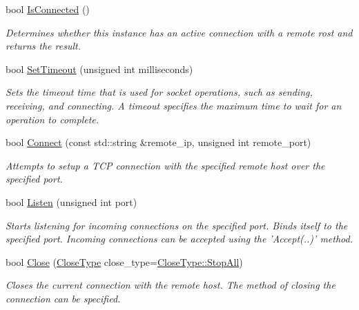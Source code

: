 \begin{DoxyCompactItemize}
bool \hyperlink{class_senergy_1_1_networking_1_1_socket_adae19c7088b61be82507a18ff1865ac8}{Is\-Connected} ()
\begin{DoxyCompactList}\small\item\em Determines whether this instance has an active connection with a remote rost and returns the result. \end{DoxyCompactList}\item 
bool \hyperlink{class_senergy_1_1_networking_1_1_socket_a5d68f35398c2460bdfca32f0d43a556d}{Set\-Timeout} (unsigned int milliseconds)
\begin{DoxyCompactList}\small\item\em Sets the timeout time that is used for socket operations, such as sending, receiving, and connecting. A timeout specifies the maximum time to wait for an operation to complete. \end{DoxyCompactList}\item 
bool \hyperlink{class_senergy_1_1_networking_1_1_socket_a8ed864e9b8fa933e7e69e95bc0fcb6d7}{Connect} (const std\-::string \&remote\-\_\-ip, unsigned int remote\-\_\-port)
\begin{DoxyCompactList}\small\item\em Attempts to setup a T\-C\-P connection with the specified remote host over the specified port. \end{DoxyCompactList}\item 
bool \hyperlink{class_senergy_1_1_networking_1_1_socket_ad347de7d31d90e088c9f7a1aefb1c288}{Listen} (unsigned int port)
\begin{DoxyCompactList}\small\item\em Starts listening for incoming connections on the specified port. Binds itself to the specified port. Incoming connections can be accepted using the 'Accept(..)' method. \end{DoxyCompactList}\item 
bool \hyperlink{class_senergy_1_1_networking_1_1_socket_ab44920bee76aba954e1dd8cfc7a7b6bf}{Close} (\hyperlink{class_senergy_1_1_networking_1_1_socket_a9a69a0d516b18e2a3bec77dc032b9993}{Close\-Type} close\-\_\-type=\hyperlink{class_senergy_1_1_networking_1_1_socket_a9a69a0d516b18e2a3bec77dc032b9993a40b522922220c34afd8e1d4a3ba02208}{Close\-Type\-::\-Stop\-All})
\begin{DoxyCompactList}\small\item\em Closes the current connection with the remote host. The method of closing the connection can be specified. \end{DoxyCompactList}\item 

\end{DoxyCompactItemize}
